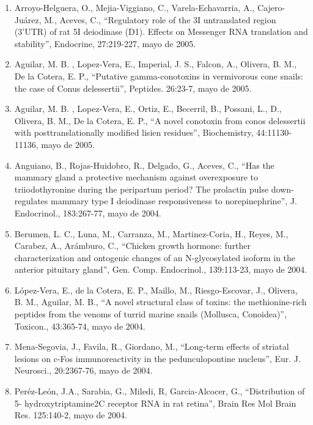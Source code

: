 \begin{enumerate}
\item Arroyo-Helguera, O., Mejia-Viggiano, C., Varela-Echavarria, A., Cajero-Juárez, M., Aceves, C., “Regulatory role of the 3I untranslated region (3’UTR) of 
rat 
5I deiodinase (D1). Effects on Messenger RNA translation and stability”, Endocrine, 27:219-227,  mayo de 2005.

\item Aguilar, M. B. , Lopez-Vera, E., Imperial, J. S., Falcon, A., Olivera, B. M., De la Cotera, E. P., “Putative gamma-conotoxins in vermivorous cone snails: 
the case of Conus delessertii”, Peptides. 26:23-7,  mayo de 2005.

\item Aguilar, M. B. , Lopez-Vera, E., Ortiz, E., Becerril, B., Possani, L., D., Olivera, B. M., De la Cotera, E. P., “A novel conotoxin from conos delessertii 
with posttranslationally modified lisien residues”, Biochemistry, 44:11130-11136,  mayo de 2005.
\item  Anguiano, B., Rojas-Huidobro, R., Delgado, G., Aceves, C., “Has the mammary gland a protective mechanism against overexposure to triiodothyronine during 
the 
peripartum period? The prolactin pulse down-regulates mammary type I deiodinase responsiveness to norepinephrine”, J. Endocrinol., 183:267-77,  mayo de 
2004.

\item Berumen, L. C., Luna, M., Carranza, M., Martinez-Coria, H., Reyes, M., Carabez, A., Arámburo, C., “Chicken growth hormone: further characterization and 
ontogenic changes of an N-glycosylated isoform in the anterior pituitary gland”, Gen. Comp. Endocrinol., 139:113-23,  mayo de 2004.

\item López-Vera, E., de la Cotera, E. P., Maillo, M., Riesgo-Escovar, J., Olivera, B. M., Aguilar, M. B., “A novel structural class of toxins: the 
methionine-rich peptides from the venoms of turrid marine snails (Mollusca, Conoidea)”, Toxicon., 43:365-74,  mayo de 2004.
\item Mena-Segovia, J., Favila, R., Giordano, M., “Long-term effects of striatal lesions on c-Fos immunoreactivity in the pedunculopontine nucleus”, Eur. J. 
Neurosci., 20:2367-76,  mayo de 2004.

\item Peréz-León, J.A., Sarabia, G., Miledi, R, Garcia-Alcocer, G., “Distribution of 5- hydroxytriptamine2C receptor RNA in rat retina”, Brain Res Mol Brain Res. 
125:140-2,  mayo de 2004.


\end{enumerate}
